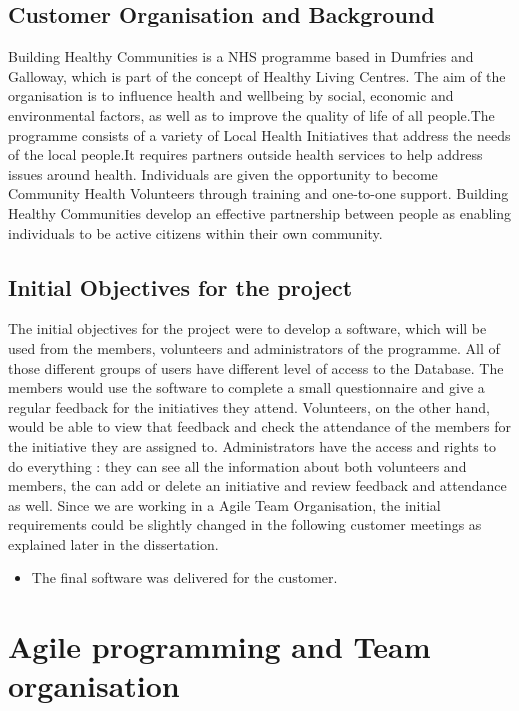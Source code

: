 \documentclass{l3proj}
\begin{document}
\subsection{Customer Organisation and Background}
\label{customer}

Building Healthy Communities is a NHS programme based in Dumfries and Galloway, which is part of the concept of Healthy Living Centres. The aim of the organisation is to influence health and wellbeing by social, economic and environmental factors, as well as to improve the quality of life of all people.The programme consists of a variety of Local Health Initiatives that address the needs of the local people.It requires partners outside health services to help address issues around health.  Individuals are given the opportunity to become Community Health Volunteers through training and one-to-one support. Building Healthy Communities develop an effective partnership between people as enabling individuals to be active citizens within their own community.

\subsection{Initial Objectives for the project}
\label{objectives}

The initial objectives for the project were to develop a software, which will be used from the members, volunteers and administrators of the programme. All of those different groups of users have different level of access to the Database. The members would use the software to  complete a small questionnaire and give a regular feedback for the initiatives they attend. Volunteers, on the other hand, would be able to view that feedback and check the attendance of the members for the initiative they are assigned to. Administrators have the access and rights to do everything : they can see all the information about both volunteers and members, the can add or delete an initiative and review feedback and attendance as well. Since we are working in a Agile Team Organisation, the initial requirements could be slightly changed in the following customer meetings as explained later in the dissertation.
\begin{itemize}
\item The final software was delivered for the customer.
\end{itemize}

\section{Agile programming and Team organisation}
\end{document}
